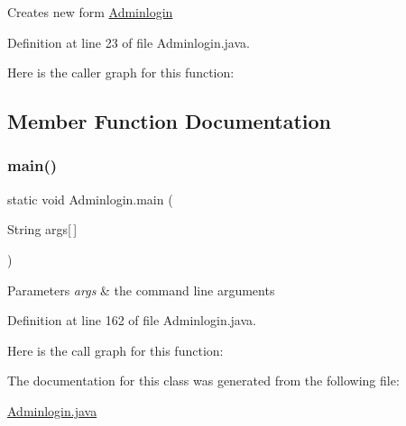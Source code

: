 Creates new form \mbox{\hyperlink{class_adminlogin}{Adminlogin}} 

Definition at line 23 of file Adminlogin.\+java.

Here is the caller graph for this function\+:


\subsection{Member Function Documentation}
\mbox{\label{class_adminlogin_a774eb850258e0061dd7871daa7fceb8b}} 
\subsubsection{\texorpdfstring{main()}{main()}}
{\footnotesize\ttfamily static void Adminlogin.\+main (\begin{DoxyParamCaption}\item[{String}]{args\mbox{[}$\,$\mbox{]} }\end{DoxyParamCaption})\hspace{0.3cm}{\ttfamily [static]}}


\begin{DoxyParams}{Parameters}
{\em args} & the command line arguments \\
\hline
\end{DoxyParams}


Definition at line 162 of file Adminlogin.\+java.

Here is the call graph for this function\+:


The documentation for this class was generated from the following file\+:\begin{DoxyCompactItemize}
\item 
\mbox{\hyperlink{_adminlogin_8java}{Adminlogin.\+java}}\end{DoxyCompactItemize}
